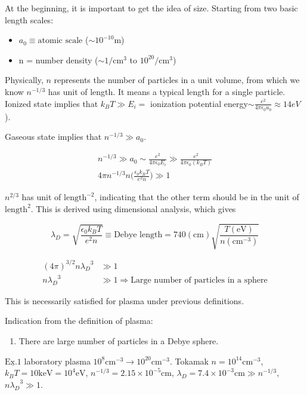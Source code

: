 \documentclass[
  notoc %
]{tufte-book}
\providecommand{\tightlist}{%
  \setlength{\itemsep}{0pt}\setlength{\parskip}{0pt}
}
\begin{document}
At the beginning, it is important to get the idea of size. Starting from
two basic length scales:

\begin{itemize}
\tightlist
\item
  \(a_0\equiv \text{atomic scale }\)(\(\sim 10^{-10}\text{m}\))
\item
  n = number density (\(\sim 1/\text{cm}^3\) to \(10^{20}/\text{cm}^3\))
\end{itemize}

Physically, \(n\) represents the number of particles in a unit volume,
from which we know \(n^{-1/3}\) has unit of length. It means a typical
length for a single particle. Ionized state implies that
\(k_B T\gg E_i=\) ionization potential
energy\(\sim \frac{e^2}{4\pi\epsilon_0 a_0}\approx 14eV\)).

Gaseous state implies that \(n^{-1/3}\gg a_0\).

\[
\begin{aligned}
n^{-1/3}\gg a_0\sim\frac{e^2}{4\pi\epsilon_0 E_i}\gg \frac{e^2}{4\pi\epsilon_0(k_B T)} \\
4\pi n^{-1/3} n \Big( \frac{\epsilon_0 k_B T}{e^2 n} \Big) \gg 1 \nonumber
\end{aligned}
\]

\(n^{2/3}\) has unit of \(\text{length}^{-2}\), indicating that the
other term should be in the unit of \(\text{length}^{2}\). This is
derived using dimensional analysis, which gives

\[
\lambda_{D}=\sqrt{\frac{\epsilon_0 k_B T}{e^2 n}}\equiv \textrm{Debye length}=740(\text{cm})\sqrt{\frac{T(\text{eV})}{n(\text{cm}^{-3})}}
\]

\[
\begin{split}
(4\pi)^{3/2}n{\lambda_{D}}^3 &\gg 1 \\
n{\lambda_D}^3 &\gg 1 \Rightarrow \text{Large number of particles in a sphere}
\end{split}
\]

This is necessarily satisfied for plasma under previous definitions.

Indication from the definition of plasma:

\begin{enumerate}
\def\labelenumi{\arabic{enumi}.}
\tightlist
\item
  There are large number of particles in a Debye sphere.
\end{enumerate}

\(\underline{\text{Ex}.1}\) laboratory plasma
\(10^{8}\text{cm}^{-3}\rightarrow 10^{20}\text{cm}^{-3}\). Tokamak
\(n=10^{14}\text{cm}^{-3}\), \(k_B T=10\text{keV}=10^4\text{eV}\),
\(n^{-1/3}=2.15\times10^{-5}\text{cm}\),
\(\lambda_D=7.4\times10^{-3}\text{cm} \gg n^{-1/3}\),
\(n{\lambda_{D}}^3\gg 1\).
\end{document}
